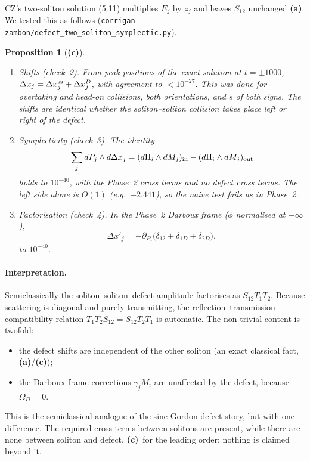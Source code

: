 \documentclass[11pt,a4paper]{article}
\newcommand{\La}{\textsf{\textbf{(a)}}}\newcommand{\Lb}{\textsf{\textbf{(b)}}}
\newcommand{\Lc}{\textsf{\textbf{(c)}}}\newcommand{\Ld}{\textsf{\textbf{(d)}}}
\newcommand{\script}[1]{\texttt{corrigan-zambon/#1}}
\newtheorem{proposition}{Proposition}\theoremstyle{remark}\newtheorem{remark}{Remark}
\begin{document}
CZ's two-soliton solution (5.11) multiplies $E_j$ by $z_j$ and leaves $S_{12}$ unchanged \La. We tested this as follows (\script{defect\_two\_soliton\_symplectic.py}).

\begin{proposition}[\Lc]\label{prop:2s}
\begin{enumerate}
\item \emph{Shifts} (check~2). From peak positions of the exact solution at $t=\pm1000$, $\Delta x_j=\Delta x_j^{\rm ss}+\Delta x_j^{D}$, with agreement to $<10^{-27}$. This was done for overtaking and head-on collisions, both orientations, and $s$ of both signs. The shifts are \emph{identical} whether the soliton--soliton collision takes place left or right of the defect.
\item \emph{Symplecticity} (check~3). The identity
\[
\sum_jdP_j\wedge d\Delta x_j=(d\Pi_i\wedge dM_j)_{\rm in}-(d\Pi_i\wedge dM_j)_{\rm out}
\]
holds to $10^{-40}$, with the Phase~2 cross terms and no defect cross terms. The left side alone is $O(1)$ (e.g.\ $-2.441$), so the naive test fails as in Phase~2.
\item \emph{Factorisation} (check~4). In the Phase~2 Darboux frame ($\phi$ normalised at $-\infty$),
\[
\Delta x'_j=-\partial_{P_j}\big(\delta_{12}+\delta_{1D}+\delta_{2D}\big),
\]
to $10^{-40}$.
\end{enumerate}
\end{proposition}

\paragraph{Interpretation.} Semiclassically the soliton--soliton--defect amplitude factorises as $S_{12}T_1T_2$. Because scattering is diagonal and purely transmitting, the reflection--transmission compatibility relation $T_1T_2S_{12}=S_{12}T_2T_1$ is automatic. The non-trivial content is twofold:
\begin{itemize}
\item the defect shifts are independent of the other soliton (an exact classical fact, \La/\Lc);
\item the Darboux-frame corrections $\gamma_jM_i$ are unaffected by the defect, because $\Omega_D=0$.
\end{itemize}
This is the semiclassical analogue of the sine-Gordon defect story, but with one difference. The required cross terms between solitons are present, while there are none between soliton and defect. \Lc\ for the leading order; nothing is claimed beyond it.
\end{document}
